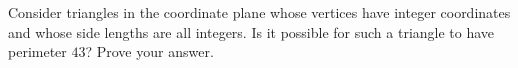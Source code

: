 Consider triangles in the coordinate plane whose vertices have integer coordinates and whose side lengths are all integers. Is it possible for such a triangle to have perimeter $43$? Prove your answer.

